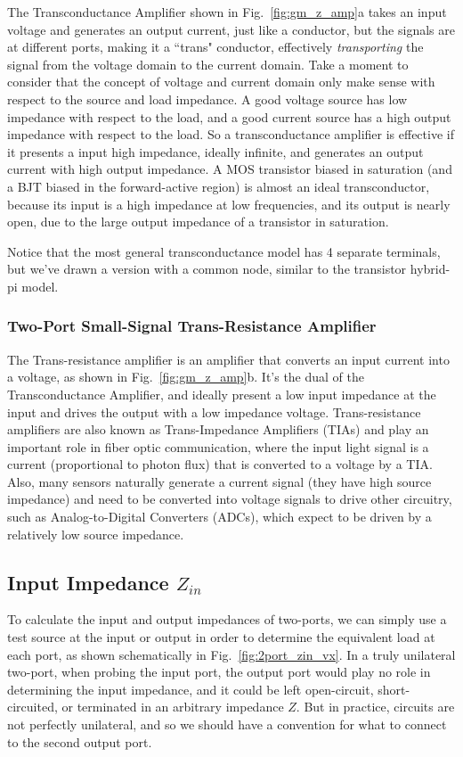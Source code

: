 The Transconductance Amplifier shown in Fig.~\ref{fig:gm_z_amp}a takes an input voltage and generates an output current, just like a conductor, but the signals are at different ports, making it a ``trans" conductor, effectively \emph{transporting} the signal from the voltage domain to the current domain.  Take a moment to consider that the concept of voltage and current domain only make sense with respect to the source and load impedance.  A good voltage source has low impedance with respect to the load, and a good current source has a high output impedance with respect to the load.  So a transconductance amplifier is effective if it presents a input high impedance, ideally infinite, and generates an output current with high output impedance.  A MOS transistor biased in saturation (and a BJT biased in the forward-active region) is almost an ideal transconductor, because its input is a high impedance at low frequencies, and its output is nearly open, due to the large output impedance of a transistor in saturation.  

Notice that the most general transconductance model has 4 separate terminals, but we've drawn a version with a common node, similar to the transistor hybrid-pi model. 
\subsubsection{Two-Port Small-Signal Trans-Resistance Amplifier}
The Trans-resistance amplifier is an amplifier that converts an input current into a voltage, as shown in Fig.~\ref{fig:gm_z_amp}b.  It's the dual of the Transconductance Amplifier, and ideally present a low input impedance at the input and drives the output with a low impedance voltage.  Trans-resistance amplifiers are also known as Trans-Impedance Amplifiers (TIAs) and play an important role in fiber optic communication, where the input light signal is a current (proportional to photon flux) that is converted to a voltage by a TIA.  Also, many sensors naturally generate a current signal (they have high source impedance) and need to be converted into voltage signals to drive other circuitry, such as Analog-to-Digital Converters (ADCs), which expect to be driven by a relatively low source impedance.  
\subsection{Input Impedance $Z_{in}$}
To calculate the input and output impedances of two-ports, we can simply use a test source at the input or output  in order to determine the equivalent load at each port, as shown schematically in Fig.~\ref{fig:2port_zin_vx}.  In a truly unilateral two-port, when probing the input port, the output port would play no role in determining the input impedance, and it could be left open-circuit, short-circuited, or terminated in an arbitrary impedance $Z$.  But in practice, circuits are not perfectly unilateral, and so we should have a convention for what to connect to the second output port.

